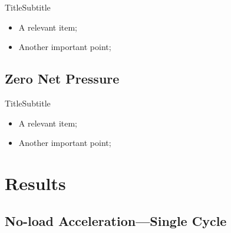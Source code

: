     \begin{frame}{Title}{Subtitle}\vspace*{-2em}
        \begin{itemize}
            \item<2->  A \alert{relevant} item;
            \item<3->  Another \alert{important} point;
        \end{itemize}
    \end{frame}

\subsection{Zero Net Pressure}

    \begin{frame}{Title}{Subtitle}\vspace*{-2em}
        \begin{itemize}
            \item<2->  A \alert{relevant} item;
            \item<3->  Another \alert{important} point;
        \end{itemize}
    \end{frame}

\section{Results}

\subsection{No-load Acceleration---Single Cycle}

